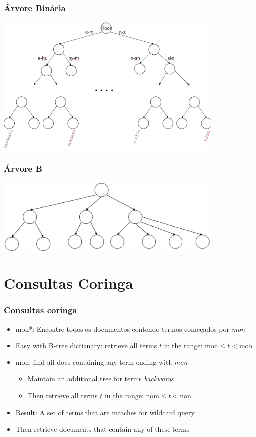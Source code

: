 \documentclass[compress]{beamer}
\def\query#1{{\sf #1}}
\begin{document}
\begin{frame}
\frametitle{Árvore Binária}
\includegraphics[width=11cm]{bst.eps}
\end{frame}

\begin{frame}
\frametitle{Árvore B}
\includegraphics[width=11cm]{btree.eps}
\end{frame}
 
 \section{Consultas Coringa}

\begin{frame}
\frametitle{Consultas coringa}
\begin{itemize}[<+->]
\item \query{mon*}: Encontre todos os documentos contendo termos começados 
por \emph{mon}
\item Easy with B-tree dictionary: retrieve
  all terms $t$ in the range: $ \mbox{mon} \leq t < 
\mbox{moo}$
\item \query{*mon}: find all docs containing any term ending
  with \emph{mon}
\begin{itemize}[<+->]
\item Maintain an additional tree for terms \emph{backwards}
\item Then retrieve  all terms $t$ in the range: $
  \mbox{nom} \leq t < 
\mbox{non}$
\end{itemize}
\item Result: A set of terms that are matches for wildcard
  query
\item Then retrieve documents that contain any of these terms
\end{itemize}
\end{frame}
\end{document}
